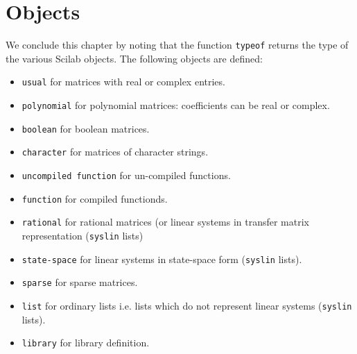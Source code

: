 \section{Objects}
We conclude this chapter by noting that the function {\tt typeof}
returns the type of the various Scilab objects. The following objects
are defined:
\begin{itemize}
\item{\tt usual} 	for matrices with real or complex entries.
\item{\tt polynomial} 	for polynomial matrices: coefficients can be 
real or complex.
\item{\tt boolean} 	for boolean matrices.
\item{\tt character} 	for matrices of character strings.
\item{\tt uncompiled function} 	for un-compiled functions.
\item{\tt function} 	for compiled functionds.
\item{\tt rational} 	for rational matrices (or linear systems in
transfer matrix representation ({\tt syslin} lists)
\item{\tt state-space} 	for linear systems in state-space 
form ({\tt syslin} lists).
\item{\tt sparse} 	for sparse matrices.
\item{\tt list} 	for ordinary lists i.e. lists which do not represent
linear systems ({\tt syslin} lists).
\item{\tt library} 	for library definition.
\end{itemize}
